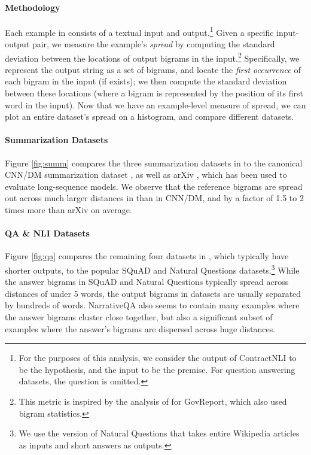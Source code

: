 \paragraph{Methodology}
Each example in \scrolls{} consists of a textual input and output.\footnote{For the purposes of this analysis, we consider the output of ContractNLI to be the hypothesis, and the input to be the premise. For question answering datasets, the question is omitted.} Given a specific input-output pair, we measure the example's \textit{spread} by computing the standard deviation between the locations of output bigrams in the input.\footnote{This metric is inspired by the analysis of \citet{huang-etal-2021-efficient} for GovReport, which also used bigram statistics.} Specifically, we represent the output string as a set of bigrams, and locate the \textit{first occurrence} of each bigram in the input (if exists); we then compute the standard deviation between these locations (where a bigram is represented by the position of its first word in the input). Now that we have an example-level measure of spread, we can plot an entire dataset's spread on a histogram, and compare different datasets.

\paragraph{Summarization Datasets} Figure \ref{fig:summ} compares the three summarization datasets in \scrolls{} to the canonical CNN/DM summarization dataset \cite{NIPS2015_afdec700}, as well as arXiv \cite{cohan-etal-2018-discourse}, which has been used to evaluate long-sequence models. We observe that the reference bigrams are spread out across much larger distances in \scrolls{} than in CNN/DM, and by a factor of 1.5 to 2 times more than arXiv on average.

\paragraph{QA \& NLI Datasets} Figure \ref{fig:qa} compares the remaining four datasets in \scrolls{}, which typically have shorter outputs, to the popular SQuAD \cite{rajpurkar-etal-2016-squad} and Natural Questions \cite{kwiatkowski-etal-2019-natural} datasets.\footnote{We use the version of Natural Questions that takes entire Wikipedia articles as inputs and short answers as outputs.} While the answer bigrams in SQuAD and Natural Questions typically spread across distances of under 5 words, the output bigrams in \scrolls{} datasets are usually separated by hundreds of words. NarrativeQA also seems to contain many examples where the answer bigrams cluster close together, but also a significant subset of examples where the answer's bigrams are dispersed across huge distances.

